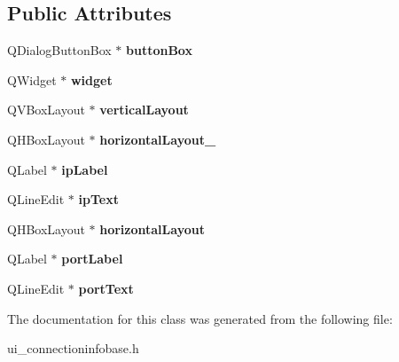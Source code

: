 \subsection*{Public Attributes}
\begin{DoxyCompactItemize}
\item 
\hypertarget{classUi__ConnectionInfoBase_a1c4e778eee1ab1637c09abf7e3db5560}{
QDialogButtonBox $\ast$ {\bfseries buttonBox}}
\label{classUi__ConnectionInfoBase_a1c4e778eee1ab1637c09abf7e3db5560}

\item 
\hypertarget{classUi__ConnectionInfoBase_aa061d4ee634fd3a171f04df2baa593f1}{
QWidget $\ast$ {\bfseries widget}}
\label{classUi__ConnectionInfoBase_aa061d4ee634fd3a171f04df2baa593f1}

\item 
\hypertarget{classUi__ConnectionInfoBase_a817e378cb15f1f6095e7395b6db05f78}{
QVBoxLayout $\ast$ {\bfseries verticalLayout}}
\label{classUi__ConnectionInfoBase_a817e378cb15f1f6095e7395b6db05f78}

\item 
\hypertarget{classUi__ConnectionInfoBase_a682ef3738a59d022b3783235713b72f4}{
QHBoxLayout $\ast$ {\bfseries horizontalLayout\_}}
\label{classUi__ConnectionInfoBase_a682ef3738a59d022b3783235713b72f4}

\item 
\hypertarget{classUi__ConnectionInfoBase_a0a56b299d09b6deebb365c5c65612c9d}{
QLabel $\ast$ {\bfseries ipLabel}}
\label{classUi__ConnectionInfoBase_a0a56b299d09b6deebb365c5c65612c9d}

\item 
\hypertarget{classUi__ConnectionInfoBase_ab31e5f805b1a309a40d25b908fb78b4c}{
QLineEdit $\ast$ {\bfseries ipText}}
\label{classUi__ConnectionInfoBase_ab31e5f805b1a309a40d25b908fb78b4c}

\item 
\hypertarget{classUi__ConnectionInfoBase_a6ad0515be24a98822125128b5fd67322}{
QHBoxLayout $\ast$ {\bfseries horizontalLayout}}
\label{classUi__ConnectionInfoBase_a6ad0515be24a98822125128b5fd67322}

\item 
\hypertarget{classUi__ConnectionInfoBase_a100580882a4ee0d9512a83aba451aa10}{
QLabel $\ast$ {\bfseries portLabel}}
\label{classUi__ConnectionInfoBase_a100580882a4ee0d9512a83aba451aa10}

\item 
\hypertarget{classUi__ConnectionInfoBase_ad4e6a38e03e4722d93583839fb9851c1}{
QLineEdit $\ast$ {\bfseries portText}}
\label{classUi__ConnectionInfoBase_ad4e6a38e03e4722d93583839fb9851c1}

\end{DoxyCompactItemize}


The documentation for this class was generated from the following file:\begin{DoxyCompactItemize}
\item 
ui\_\-connectioninfobase.h\end{DoxyCompactItemize}
